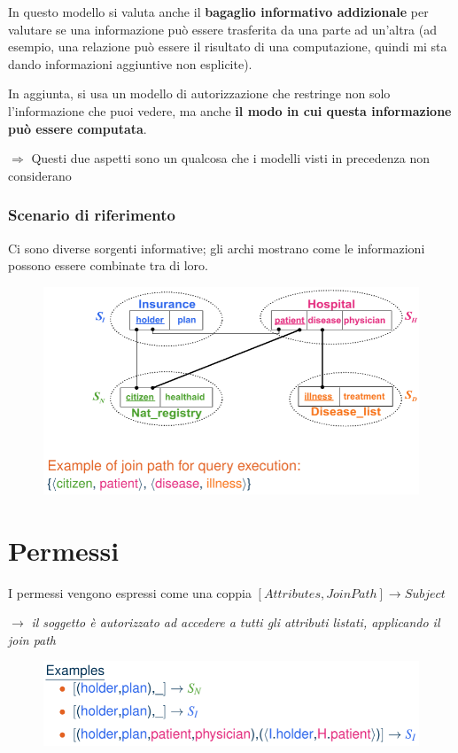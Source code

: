 \documentclass{report}
\begin{document}
\noindent In questo modello si valuta anche il \textbf{bagaglio informativo addizionale} per valutare se una informazione 
può essere trasferita da una parte ad un'altra (ad esempio, una relazione può essere il risultato di una computazione, 
quindi mi sta dando informazioni aggiuntive non esplicite).

\noindent In aggiunta, si usa un modello di autorizzazione che restringe non solo l'informazione che puoi vedere, 
ma anche \textbf{il modo in cui questa informazione può essere computata}.

\noindent $\Rightarrow$ Questi due aspetti sono un qualcosa che i modelli visti in precedenza non considerano

\newpage
\subsubsection{Scenario di riferimento}
Ci sono diverse sorgenti informative; gli archi mostrano come le informazioni possono essere 
combinate tra di loro.

\begin{figure}[H]
    \centering
    \includegraphics[width=1\linewidth]{images/scenario.png}
\end{figure}


\section{Permessi}
I permessi vengono espressi come una coppia $[Attributes, Join Path] \rightarrow Subject$

$\rightarrow$ \textit{il soggetto è autorizzato ad accedere a tutti gli attributi listati, applicando il join path}

\begin{figure}[H]
    \centering
    \includegraphics[width=0.8\linewidth]{images/permessi-ex.png}
\end{figure}
\end{document}
